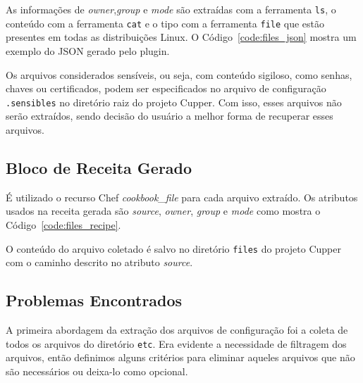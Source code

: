 As informações de \textit{owner},\textit{group} e \textit{mode} são extraídas com a ferramenta \texttt{ls},
o conteúdo com a ferramenta \texttt{cat} e o tipo com a ferramenta \texttt{file}
que estão presentes em todas as distribuições Linux.
O Código~\ref{code:files_json} mostra um exemplo do JSON gerado pelo plugin.

\noindent\begin{minipage}{\textwidth}
  \lstset{style=shell}
  
\end{minipage}\hfill

Os arquivos considerados sensíveis, ou seja, com conteúdo sigiloso, como
senhas, chaves ou certificados, podem ser especificados no arquivo de
configuração \texttt{.sensibles} no diretório raiz do projeto Cupper. Com isso,
esses arquivos não serão extraídos, sendo decisão do usuário a melhor forma
de recuperar esses arquivos.

\subsection{Bloco de Receita Gerado}

É utilizado o recurso Chef \textit{cookbook\_file} para cada arquivo extraído.
Os atributos usados na receita gerada são \textit{source}, \textit{owner},
\textit{group} e \textit{mode} como mostra o Código~\ref{code:files_recipe}.

\noindent\begin{minipage}{\textwidth}
  \lstset{style=shell}
  
\end{minipage}\hfill

O conteúdo do arquivo coletado é salvo no diretório \texttt{files} do projeto Cupper
com o caminho descrito no atributo \textit{source}.

\subsection{Problemas Encontrados}

A primeira abordagem da extração dos arquivos de configuração foi a coleta de todos
os arquivos do diretório \texttt{etc}. Era evidente a necessidade de filtragem dos
arquivos, então definimos alguns critérios para eliminar aqueles arquivos que não são
necessários ou deixa-lo como opcional.

